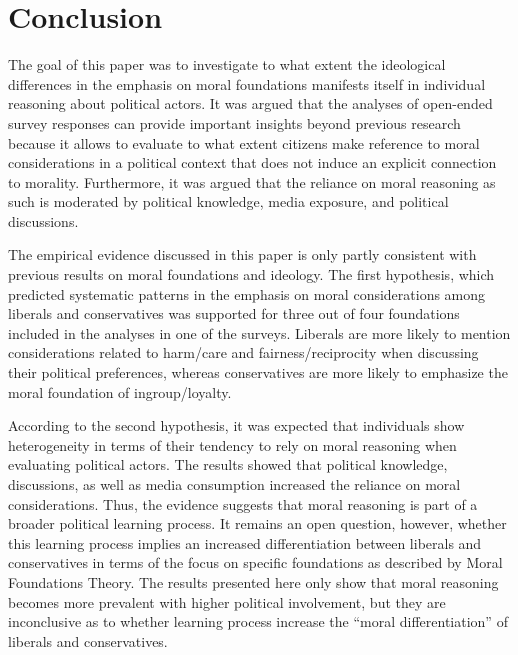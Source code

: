\documentclass[12pt]{article}
\begin{document}
\section{Conclusion}

The goal of this paper was to investigate to what extent the ideological differences in the emphasis on moral foundations manifests itself in individual reasoning about political actors. It was argued that the analyses of open-ended survey responses can provide important insights beyond previous research because it allows to evaluate to what extent citizens make reference to moral considerations in a political context that does not induce an explicit connection to morality. Furthermore, it was argued that the reliance on moral reasoning as such is moderated by political knowledge, media exposure, and political discussions.

The empirical evidence discussed in this paper is only partly consistent with previous results on moral foundations and ideology. The first hypothesis, which predicted systematic patterns in the emphasis on moral considerations among liberals and conservatives was supported for three out of four foundations included in the analyses in one of the surveys. Liberals are more likely to mention considerations related to harm/care and fairness/reciprocity when discussing their political preferences, whereas conservatives are more likely to emphasize the moral foundation of ingroup/loyalty.


According to the second hypothesis, it was expected that individuals show heterogeneity in terms of their tendency to rely on moral reasoning when evaluating political actors. The results showed that political knowledge, discussions, as well as media consumption increased the reliance on moral considerations. Thus, the evidence suggests that moral reasoning is part of a broader political learning process. It remains an open question, however, whether this learning process implies an increased differentiation between liberals and conservatives in terms of the focus on specific foundations as described by Moral Foundations Theory. The results presented here only show that moral reasoning becomes more prevalent with higher political involvement, but they are inconclusive as to whether learning process increase the ``moral differentiation'' of liberals and conservatives.
%
%
\end{document}
